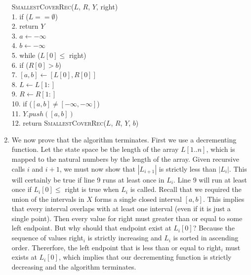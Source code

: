 \documentclass{article}
\begin{document}
\begin{enumerate}
\begin{algorithm}
        \textsc{SmallestCoverRec}($L$, $R$, $Y$, right) \\
        1. \hspace{1em} if ($L == \emptyset$) \\
        2. \hspace{2em}     return $Y$ \\
        3. \hspace{1em} $a \gets -\infty$ \\
        4. \hspace{1em} $b \gets -\infty$ \\
        5. \hspace{1em} while ($L[0] \leq $ right) \\
        6. \hspace{2em}     if ($R[0] > b$) \\
        7. \hspace{3em}         $[a,b] \gets [L[0], R[0]]$ \\
        8. \hspace{2em}     $L \gets L[1:]$ \\
        9. \hspace{2em}     $R \gets R[1:]$ \\
        10. \hspace{0.5em} if ($[a,b] \neq [-\infty,-\infty]$) \\
        11. \hspace{1.5em} $Y.push([a,b])$ \\
        12. \hspace{0.5em} return \textsc{SmallestCoverRec}($L$, $R$, $Y$, $b$)
    \end{algorithm}
    \item We now prove that the algorithm terminates.
    First we use a decrementing function.
    Let the state space be the length of the array $L[1..n]$, which is mapped to the natural numbers by the length of the array.
    Given recursive calls $i$ and $i+1$, we must now show that $|L_{i+1}|$ is strictly less than $|L_i|$.
    This will certainly be true if line 9 runs at least once in $L_i$.
    Line 9 will run at least once if $L_i[0] \leq $ right is true when $L_i$ is called.
    Recall that we required the union of the intervals in $X$ forms a single closed interval $[a,b]$.
    This implies that every interval overlaps with at least one interval (even if it is just a single point).
    Then every value for right must greater than or equal to some left endpoint.
    But why should that endpoint exist at $L_i[0]$?
    Because the sequence of values right$_i$ is strictly increasing and $L_i$ is sorted in ascending order.
    Thererfore, the left endpoint that is less than or equal to right$_i$ must exists at $L_i[0]$, which implies that our decrementing function is strictly decreasing and the algorithm terminates.


\end{enumerate}
\end{document}
